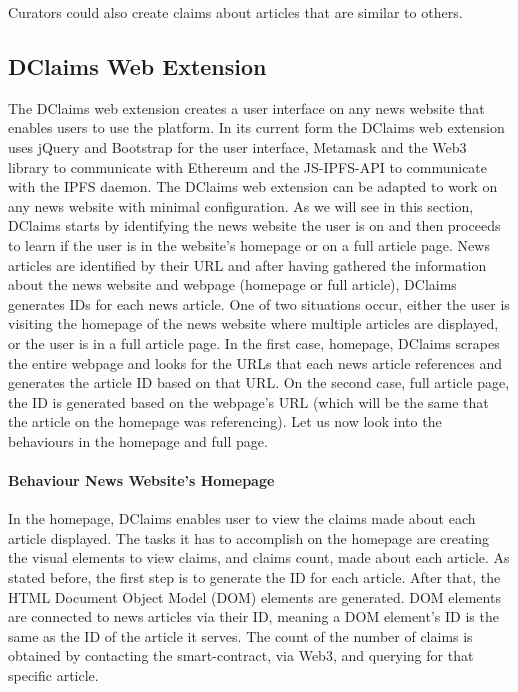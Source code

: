 Curators could also create claims about articles that are similar to others.


\subsection{DClaims Web Extension}
The DClaims web extension creates a user interface on any news website that enables users to use the platform.
In its current form the DClaims web extension uses jQuery and Bootstrap for the user interface, Metamask and the Web3 library to communicate with Ethereum and the JS-IPFS-API to communicate with the IPFS daemon.
The DClaims web extension can be adapted to work on any news website with minimal configuration. As we will see in this section, DClaims starts by identifying the news website the user is on and then proceeds to learn if the user is in the website’s homepage or on a full article page.
News articles are identified by their URL and after having gathered the information about the news website and webpage (homepage or full article), DClaims generates IDs for each news article. One of two situations occur, either the user is visiting the homepage of the news website where multiple articles are displayed, or the user is in a full article page. In the first case, homepage, DClaims scrapes the entire webpage and looks for the URLs that each news article references and generates the article ID based on that URL. On the second case, full article page, the ID is generated based on the webpage’s URL (which will be the same that the article on the homepage was referencing). Let us now look into the behaviours in the homepage and full page.

\paragraph{Behaviour News Website’s Homepage}
In the homepage, DClaims enables user to view the claims made about each article displayed. The tasks it has to accomplish on the homepage are creating the visual elements to view claims, and claims count, made about each article. As stated before, the first step is to generate the ID for each article. After that, the HTML Document Object Model (DOM) elements are generated. DOM elements are connected to news articles via their ID, meaning a DOM element’s ID is the same as the ID of the article it serves.
The count of the number of claims is obtained by contacting the smart-contract, via Web3, and querying for that specific article.

